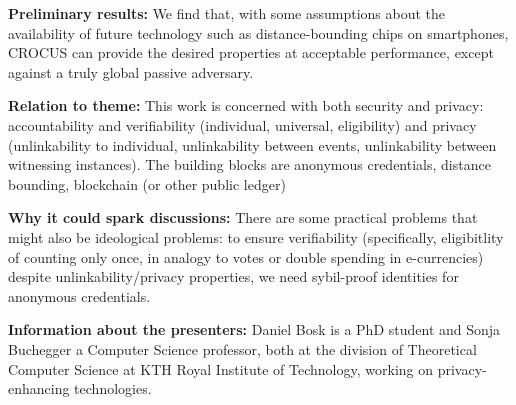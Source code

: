 \textbf{Preliminary results:} We find that, with some
 assumptions about the availability of future technology such as
 distance-bounding chips on smartphones, CROCUS can provide the
 desired properties at acceptable performance, except against a truly
 global passive adversary.

\textbf{Relation to theme:} This work is concerned with both security
and privacy: accountability and verifiability (individual, universal, eligibility) and
privacy (unlinkability to individual, unlinkability between events,
unlinkability between witnessing instances). The building blocks are
anonymous credentials, distance bounding, blockchain (or other public ledger)


\textbf{Why it could spark discussions:} There are some practical
problems that might also be ideological problems: to ensure
verifiability (specifically, eligibitlity of counting only once, in
analogy to votes or double spending in e-currencies) despite
unlinkability/privacy properties, we need sybil-proof identities for
anonymous credentials.

\textbf{Information about the presenters:} Daniel Bosk is a PhD
student and Sonja Buchegger a Computer Science professor, both at the
division of Theoretical Computer Science at KTH Royal Institute of
Technology, working on privacy-enhancing technologies.